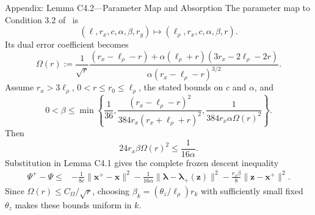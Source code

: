 \documentclass[handout,compress,9pt]{beamer}
\newcommand{\bx}{\bm{x}}
\newcommand{\bz}{\bm{z}}
\newcommand{\blmbd}{\bm{\lambda}}
\begin{document}
\begin{frame}{Appendix: Lemma C4.2---Parameter Map and Absorption
\hfill\hyperlink{appendix:contents}{}}
\scriptsize
The parameter map to Condition 3.2 of~{\normalfont[4]} is
\begin{equation*}
  (\ell,r_x,c,\alpha,\beta,r_y)
  \longmapsto(\ell_\rho,r_x,c,\alpha,\beta,r).
\end{equation*}
Its dual error coefficient becomes
\begin{equation*}
  \Omega(r)
  :=\frac1{\sqrt r}
  \frac{(r_x-\ell_\rho-r)
  +\alpha(\ell_\rho+r)(3r_x-2\ell_\rho-2r)}
  {\alpha(r_x-\ell_\rho-r)^{3/2}}.
\end{equation*}
Assume $r_x>3\ell_\rho$, $0<r\le r_0\le\ell_\rho$, the stated bounds on
$c$ and $\alpha$, and
\begin{equation*}
  0<\beta\le\min\left\{
  \frac1{36},
  \frac{(r_x-\ell_\rho-r)^2}
  {384r_x(r_x+\ell_\rho+r)^2},
  \frac1{384r_x\alpha\Omega(r)^2}
  \right\}.
\end{equation*}
Then
\begin{equation*}
  24r_x\beta\Omega(r)^2\le\frac1{16\alpha}.
\end{equation*}
Substitution in Lemma C4.1 gives the complete frozen descent inequality
\begin{equation*}
\begin{aligned}
  \Psi^+-\Psi\le{}&-\frac1{8c}\|\bx^+-\bx\|^2
  -\frac1{16\alpha}\|\blmbd-\blmbd_+(\bz)\|^2
  -\frac{r_x\beta}{8}\|\bz-\bx^+\|^2.
\end{aligned}
\end{equation*}
Since $\Omega(r)\le C_\Omega/\sqrt r$, choosing
$\beta_k=(\theta_z/\ell_\rho)r_k$ with sufficiently small fixed $\theta_z$
makes these bounds uniform in $k$.
\end{frame}
\end{document}
